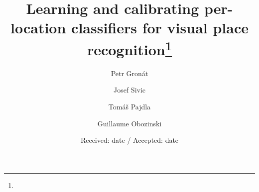 \renewcommand{\algorithmicrequire}{\textbf{Input:}}
\renewcommand{\algorithmicensure}{\textbf{Output:}}
%
%


\title{Learning and calibrating per-location classifiers for visual place recognition\thanks{
}}



\author{Petr Gron{\'a}t         \and
        Josef {S}ivic          \and
        Tom{\'a}{\v s} Pajdla   \and
        Guillaume Obozinski%
}


\vspace{-5mm}
\date{Received: date / Accepted: date}

\maketitle

